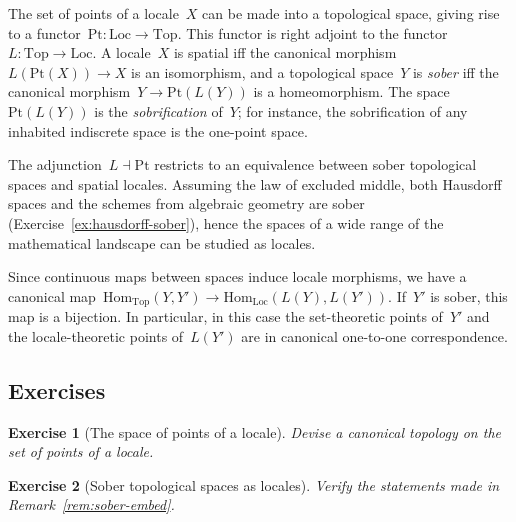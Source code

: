 \documentclass{ws-rv9x6}
\newtheorem{ex}{Exercise}
\newenvironment{exercise}[1]{
  \begin{ex}[#1]
}{\end{ex}}
\newcommand{\Hom}{\mathrm{Hom}}
\renewcommand{\_}{\mathpunct{.}}
\newcommand{\?}{\,{:}\,}
\newcommand{\Pt}{\mathrm{Pt}}
\newcommand{\Loc}{\mathrm{Loc}}
\newcommand{\Top}{\mathrm{Top}}
\begin{document}
\begin{remark}\label{rem:definition-sober}
The set of points of a locale~$X$ can be made into a topological space, giving
rise to a functor~$\Pt : \Loc \to \Top$. This functor is right adjoint
to the functor~$L : \Top \to \Loc$. A locale~$X$ is spatial iff the canonical
morphism~$L(\Pt(X)) \to X$ is an isomorphism, and a topological space~$Y$
is \emph{sober} iff the canonical morphism~$Y \to \Pt(L(Y))$ is a
homeomorphism. The space~$\Pt(L(Y))$ is the \emph{sobrification} of~$Y$; for
instance, the sobrification of any inhabited indiscrete space is the one-point
space.

The adjunction~$L \dashv \Pt$ restricts to an equivalence between sober
topological spaces and spatial locales. Assuming the law of excluded middle,
both Hausdorff spaces and the schemes from algebraic geometry are sober
(Exercise~\ref{ex:hausdorff-sober}), hence the spaces of a wide
range of the mathematical landscape can be studied as locales.\end{remark}

\begin{remark}\label{rem:sober-embed}
Since continuous maps between spaces induce locale morphisms, we
have a canonical map~$\Hom_\Top(Y,Y') \to \Hom_\Loc(L(Y),L(Y'))$. If~$Y'$ is
sober, this map is a bijection. In particular, in this case the set-theoretic points
of~$Y'$ and the locale-theoretic points of~$L(Y')$ are in canonical
one-to-one correspondence.
\end{remark}


\subsection*{Exercises}

\begin{exercise}{The space of points of a locale}%
\label{ex:canonical-topology}%
Devise a canonical to\-po\-logy on the set of points of a locale.
\end{exercise}

\begin{exercise}{Sober topological spaces as locales}%
Verify the statements made in Remark~\ref{rem:sober-embed}.
\end{exercise}
\end{document}
